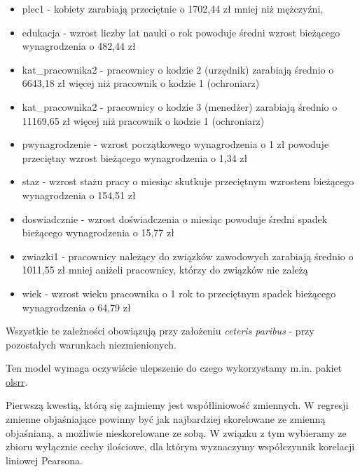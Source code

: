 \documentclass[]{book}
\newenvironment{Shaded}{\begin{snugshade}}{\end{snugshade}}
\newcommand{\DataTypeTok}[1]{\textcolor[rgb]{0.13,0.29,0.53}{#1}}
\newcommand{\KeywordTok}[1]{\textcolor[rgb]{0.13,0.29,0.53}{\textbf{#1}}}
\newcommand{\NormalTok}[1]{#1}
\newcommand{\OperatorTok}[1]{\textcolor[rgb]{0.81,0.36,0.00}{\textbf{#1}}}
\newcommand{\StringTok}[1]{\textcolor[rgb]{0.31,0.60,0.02}{#1}}
\providecommand{\tightlist}{%
  \setlength{\itemsep}{0pt}\setlength{\parskip}{0pt}}
\begin{document}
\begin{itemize}
\tightlist
\item
  plec1 - kobiety zarabiają przeciętnie o 1702,44 zł mniej niż mężczyźni,
\item
  edukacja - wzrost liczby lat nauki o rok powoduje średni wzrost bieżącego wynagrodzenia o 482,44 zł
\item
  kat\_pracownika2 - pracownicy o kodzie 2 (urzędnik) zarabiają średnio o 6643,18 zł więcej niż pracownik o kodzie 1 (ochroniarz)
\item
  kat\_pracownika2 - pracownicy o kodzie 3 (menedżer) zarabiają średnio o 11169,65 zł więcej niż pracownik o kodzie 1 (ochroniarz)
\item
  pwynagrodzenie - wzrost początkowego wynagrodzenia o 1 zł powoduje przeciętny wzrost bieżącego wynagrodzenia o 1,34 zł
\item
  staz - wzrost stażu pracy o miesiąc skutkuje przeciętnym wzrostem bieżącego wynagrodzenia o 154,51 zł
\item
  doswiadcznie - wzrost doświadczenia o miesiąc powoduje średni spadek bieżącego wynagrodzenia o 15,77 zł
\item
  zwiazki1 - pracownicy należący do związków zawodowych zarabiają średnio o 1011,55 zł mniej aniżeli pracownicy, którzy do związków nie zależą
\item
  wiek - wzrost wieku pracownika o 1 rok to przeciętnym spadek bieżącego wynagrodzenia o 64,79 zł
\end{itemize}

Wszystkie te zależności obowiązują przy założeniu \emph{ceteris paribus} - przy pozostałych warunkach niezmienionych.

Ten model wymaga oczywiście ulepszenie do czego wykorzystamy m.in. pakiet \href{https://cran.r-project.org/web/packages/olsrr/index.html}{olsrr}.

Pierwszą kwestią, którą się zajmiemy jest współliniowość zmiennych. W regresji zmienne objaśniające powinny być jak najbardziej skorelowane ze zmienną objaśnianą, a możliwie nieskorelowane ze sobą. W związku z tym wybieramy ze zbioru wyłącznie cechy ilościowe, dla którym wyznaczymy współczynnik korelacji liniowej Pearsona.

\begin{Shaded}
\end{Shaded}
\end{document}
